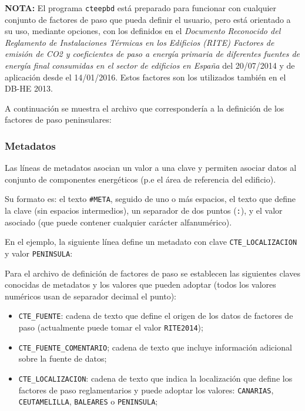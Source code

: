 \documentclass[10pt,notitlepage,oneside,a4paper]{article}
\begin{document}
\begin{myquote}\small
\textbf{NOTA:} El programa \texttt{cteepbd} está preparado para funcionar con cualquier conjunto de factores de paso que pueda definir el usuario, pero está orientado a su uso, mediante opciones, con los definidos en el \textit{Documento Reconocido del Reglamento de Instalaciones Térmicas en los Edificios (RITE) Factores de emisión de CO2 y coeficientes de paso a energía primaria de diferentes fuentes de energía final consumidas en el sector de edificios en España} del 20/07/2014 y de aplicación desde el 14/01/2016. Estos factores son los utilizados también en el DB-HE 2013.
\end{myquote}

A continuación se muestra el archivo que correspondería a la definición de los factores de paso peninsulares:



\subsubsection{Metadatos}

Las líneas de metadatos asocian un valor a una clave y permiten asociar datos al conjunto de componentes energéticos (p.e el área de referencia del edificio).

Su formato es: el texto \texttt{\#META}, seguido de uno o más espacios, el texto que define la clave (sin espacios intermedios), un separador de dos puntos (\texttt{:}), y el valor asociado (que puede contener cualquier carácter alfanumérico).

En el ejemplo, la siguiente línea define un metadato con clave \texttt{CTE\_LOCALIZACION} y valor \texttt{PENINSULA}:



Para el archivo de definición de factores de paso se establecen las siguientes claves conocidas de metadatos y los valores que pueden adoptar (todos los valores numéricos usan de separador decimal el punto):

\begin{itemize}
\item \texttt{CTE\_FUENTE}: cadena de texto que define el origen de los datos de factores de paso (actualmente puede tomar el valor \texttt{RITE2014});
\item \texttt{CTE\_FUENTE\_COMENTARIO}; cadena de texto que incluye información adicional sobre la fuente de datos;
\item \texttt{CTE\_LOCALIZACION}: cadena de texto que indica la localización que define los factores de paso reglamentarios y puede adoptar los valores: \texttt{CANARIAS}, \texttt{CEUTAMELILLA}, \texttt{BALEARES} o \texttt{PENINSULA};
\end{itemize}
\end{document}
